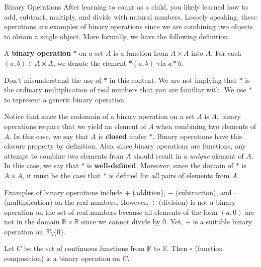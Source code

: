 \begin{section}{Binary Operations}
After learning to count as a child, you likely learned how to add, subtract, multiply, and divide with natural numbers.  Loosely speaking, these operations are examples of binary operations since we are combining two objects to obtain a single object.  More formally, we have the following definition.

\begin{definition}
A \textbf{binary operation} $*$ on a set $A$ is a function from $A\times A$ into $A$.  For each $(a,b)\in A\times A$, we denote the element $*(a,b)$ via $a*b$.
\end{definition}

\begin{remark}
Don't misunderstand the use of $*$ in this context.  We are not implying that $*$ is the ordinary multiplication of real numbers that you are familiar with.  We use $*$ to represent a generic binary operation.  
\end{remark}

\begin{remark}
Notice that since the codomain of a binary operation on a set $A$ is $A$, binary operations require that we yield an element of $A$ when combining two elements of $A$.  In this case, we say that $A$ is \textbf{closed} under $*$.  Binary operations have this closure property by definition.  Also, since binary operations are functions, any attempt to combine two elements from $A$ should result in a \emph{unique} element of $A$.  In this case, we say that $*$ is \textbf{well-defined}.  Moreover, since the domain of $*$ is $A\times A$, it must be the case that $*$ is defined for \emph{all} pairs of elements from $A$.
\end{remark}

\begin{example}
Examples of binary operations include $+$ (addition), $-$ (subtraction), and $\cdot$ (multiplication) on the real numbers.  However, $\div$ (division) is not a binary operation on the set of real numbers because all elements of the form $(a,0)$ are not in the domain $\mathbb{R}\times \mathbb{R}$ since we cannot divide by 0.  Yet, $\div$ is a suitable binary operation on $\mathbb{R}\setminus \{0\}$.
\end{example}

\begin{example}
Let $C$ be the set of continuous functions from $\mathbb{R}$ to $\mathbb{R}$.  Then $\circ$ (function composition) is a binary operation on $C$.
\end{example}


\end{section}
